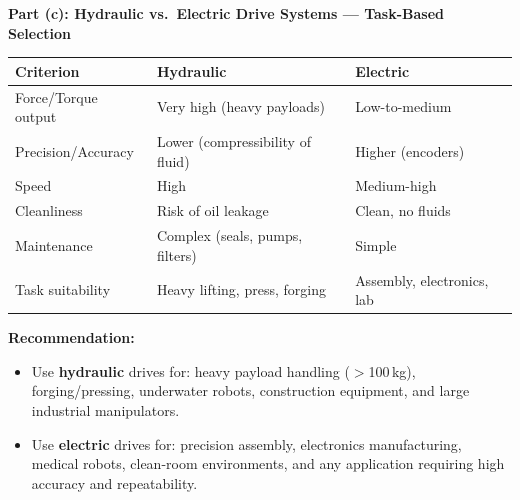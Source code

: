 \documentclass[12pt,a3paper]{article}
\begin{document}
\begin{enumerate}
\begin{tcolorbox}[enhanced,breakable,ansbox,colback=cA!4,colframe=cA,
  boxrule=0.8pt,arc=5pt,
  title={\textbf{Answer}},fonttitle=\bfseries\color{white},colbacktitle=cA]
\hrulefill

\textbf{Part (c): Hydraulic vs.\ Electric Drive Systems — Task-Based Selection}

\begin{center}
\small
\begin{tabular}{@{}lll@{}}
\toprule
\textbf{Criterion}        & \textbf{Hydraulic}                & \textbf{Electric} \\
\midrule
Force/Torque output       & Very high (heavy payloads)        & Low-to-medium \\
Precision/Accuracy        & Lower (compressibility of fluid)  & Higher (encoders) \\
Speed                     & High                              & Medium-high \\
Cleanliness               & Risk of oil leakage               & Clean, no fluids \\
Maintenance               & Complex (seals, pumps, filters)   & Simple \\
Task suitability          & Heavy lifting, press, forging     & Assembly, electronics, lab \\
\bottomrule
\end{tabular}
\end{center}

\textbf{Recommendation:}
\begin{itemize}[leftmargin=1.5em,itemsep=1pt]
  \item Use \textbf{hydraulic} drives for: heavy payload handling
        ($>$100\,kg), forging/pressing, underwater robots, construction
        equipment, and large industrial manipulators.
  \item Use \textbf{electric} drives for: precision assembly, electronics
        manufacturing, medical robots, clean-room environments, and
        any application requiring high accuracy and repeatability.
\end{itemize}

\end{tcolorbox}



\end{enumerate}
\end{document}
